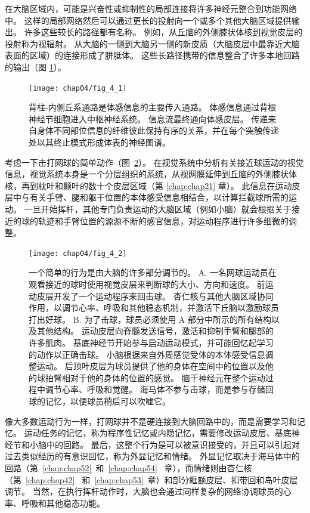 在大脑区域内，可能是兴奋性或抑制性的局部连接将许多神经元整合到功能网络中。 
这样的局部网络然后可以通过更长的投射向一个或多个其他大脑区域提供输出。 
许多这些较长的路径都有名称。 
例如，从丘脑的外侧膝状体核到视觉皮层的投射称为视辐射。 
从大脑的一侧到大脑另一侧的新皮质（大脑皮层中最靠近大脑表面的区域）的连接形成了胼胝体。 
这些长路径携带的信息整合了许多本地回路的输出（图 \ref{fig:4_1}）。

\begin{figure}[htbp]
	\centering
	\texttt{[image: chap04/fig\_4\_1]}
	\caption{背柱-内侧丘系通路是体感信息的主要传入通路。 
		体感信息通过背根神经节细胞进入中枢神经系统。 
		信息流最终通向体感皮层。 
		传递来自身体不同部位信息的纤维彼此保持有序的关系，并在每个突触传递处以其终止模式形成体表的神经图谱。}
	\label{fig:4_1}
\end{figure}


考虑一下击打网球的简单动作（图~\ref{fig:4_2}）。 
在视觉系统中分析有关接近球运动的视觉信息，视觉系统本身是一个分层组织的系统，从视网膜延伸到丘脑的外侧膝状体核，再到枕叶和颞叶的数十个皮层区域（第 \ref{chap:chap21} 章）。
此信息在运动皮层中与有关手臂、腿和躯干位置的本体感受信息相结合，以计算拦截球所需的运动。 
一旦开始挥杆，其他专门负责运动的大脑区域（例如小脑）就会根据关于接近的球的轨迹和手臂位置的源源不断的感官信息，对运动程序进行许多细微的调整。

\begin{figure}[htbp]
	\centering
	\texttt{[image: chap04/fig\_4\_2]}
	\caption{一个简单的行为是由大脑的许多部分调节的。 
		A. 一名网球运动员在观看接近的球时使用视觉皮层来判断球的大小、方向和速度。 
		前运动皮层开发了一个运动程序来回击球。 
		杏仁核与其他大脑区域协同作用，以调节心率、呼吸和其他稳态机制，并激活下丘脑以激励球员打出好球。 
		B. 为了击球，球员必须使用 A 部分中所示的所有结构以及其他结构。 
		运动皮层向脊髓发送信号，激活和抑制手臂和腿部的许多肌肉。 
		基底神经节开始参与启动运动模式，并可能回忆起学习的动作以正确击球。 
		小脑根据来自外周感觉受体的本体感受信息调整运动。 
		后顶叶皮层为球员提供了他的身体在空间中的位置以及他的球拍臂相对于他的身体的位置的感觉。 
		脑干神经元在整个运动过程中调节心率、呼吸和觉醒。 
		海马体不参与击球，而是参与存储回球的记忆，以便球员稍后可以吹嘘它。}
	\label{fig:4_2}
\end{figure}


像大多数运动行为一样，打网球并不是硬连接到大脑回路中的，而是需要学习和记忆。
运动任务的记忆，称为程序性记忆或内隐记忆，需要修改运动皮层、基底神经节和小脑中的回路。
最后，这整个行为是可以被意识接受的，并且可以引起对过去类似经历的有意识回忆，称为外显记忆和情绪。 
外显记忆取决于海马体中的回路（第~\ref{chap:chap52}~和~\ref{chap:chap54}~ 章），而情绪则由杏仁核（第~\ref{chap:chap42}~ 和~\ref{chap:chap53}~章）和部分眶额皮层、扣带回和岛叶皮层调节。 
当然，在执行挥杆动作时，大脑也会通过同样复杂的网络协调球员的心率、呼吸和其他稳态功能。



